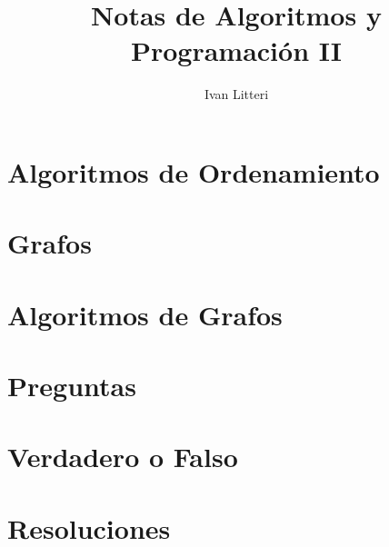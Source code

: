 \documentclass{article}
\title{Notas de Algoritmos y Programación II}
\author{Ivan Litteri}
\date{}
\begin{document}
\maketitle
\lstset{language=C}
\lstset{language=Python}
\tableofcontents
\clearpage

\section{Algoritmos de Ordenamiento}


\clearpage

\section{Grafos}

\clearpage

\section{Algoritmos de Grafos}

\clearpage

\section{Preguntas}

\clearpage

\section{Verdadero o Falso}

\clearpage

\section{Resoluciones}

\clearpage

\printindex
\end{document}
